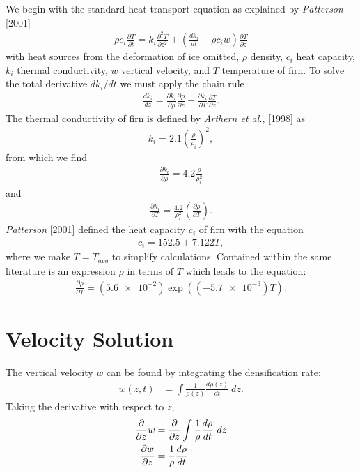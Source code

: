\documentclass{article}%
\begin{document}
We begin with the standard heat-transport equation as explained by \emph{Patterson} [2001]
\begin{align}
  \rho c_i \frac{\partial T}{\partial t} = 
    k_i \frac{\partial^2 T}{\partial z^2} +
    \left( \frac{dk_i}{dt} - \rho c_i w \right) \frac{\partial T}{\partial z}
\end{align}
with heat sources from the deformation of ice omitted, $\rho$ density, $c_i$ heat capacity, $k_i$ thermal conductivity, $w$ vertical velocity, and $T$ temperature of firn.  To solve the total derivative $dk_i/dt$ we must apply the chain rule
\begin{align*}
  \frac{dk_i}{dz} = 
  \frac{\partial k_i}{\partial \rho} \frac{\partial \rho}{\partial z} + 
  \frac{\partial k_i}{\partial T} \frac{\partial T}{\partial z}.
\end{align*}
The thermal conductivity of firn is defined by \emph{Arthern et al.}, [1998] as
\begin{align}
  k_i = 2.1 \left(\frac{\rho}{\rho_i}\right)^2,
\end{align}
from which we find
\begin{align*}
  \frac{\partial k_i}{\partial \rho} = 
    4.2 \frac{\rho}{\rho_i^2}
\end{align*}
and
\begin{align*}
  \frac{\partial k_i}{\partial T} = 
    \frac{4.2}{\rho_i^2} \left( \frac{\partial \rho}{\partial T} \right).
\end{align*}
\emph{Patterson} [2001] defined the heat capacity $c_i$ of firn with the equation
\begin{align}
  c_i = 152.5 + 7.122 T,
\end{align}
where we make $T=T_{avg}$ to simplify calculations.  Contained within the same literature is an expression $\rho$ in terms of $T$ which leads to the equation:
\begin{align}
  \frac{\partial \rho}{\partial T} = 
    (\SI{5.6e-2}) \exp ((\SI{-5.7e-3})T).
\end{align}



\section{Velocity Solution}

The vertical velocity $w$ can be found by integrating the densification rate:
\begin{align*}
  w(z,t) &= \int \frac{1}{\rho(z)} \frac{d\rho(z)}{dt}\ dz.
\end{align*}
Taking the derivative with respect to $z$,
\begin{align}
  \frac{\partial}{\partial z} w &= \frac{\partial}{\partial z} \int \frac{1}{\rho} \frac{d\rho}{dt}\ dz \notag \\
  \frac{\partial w}{\partial z} &= \frac{1}{\rho} \frac{d\rho}{dt}.
\end{align}
\end{document}
